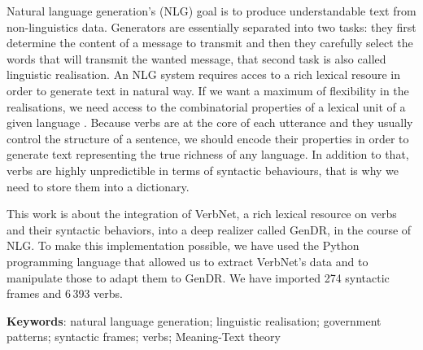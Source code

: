 Natural language generation's (NLG) goal is to produce understandable text from non-linguistics data. Generators are essentially separated into two tasks: they first determine the content of a message to transmit and then they carefully select the words that will transmit the wanted message, that second task is also called linguistic realisation. An NLG system requires acces to a rich lexical resoure in order to generate text in natural way. If we want a maximum of flexibility in the realisations, we need access to the combinatorial properties of a lexical unit of a given language . Because verbs are at the core of each utterance and they usually control the structure of a sentence, we should encode their properties in order to generate text representing the true richness of any language. In addition to that, verbs are highly unpredictible in terms of syntactic behaviours, that is why we need to store them into a dictionary.

This work is about the integration of VerbNet, a rich lexical resource on verbs and their syntactic behaviors, into a deep realizer called GenDR, in the course of NLG. To make this implementation possible, we have used the Python programming language that allowed us to extract VerbNet's data and to manipulate those to adapt them to GenDR. We have imported 274 syntactic frames and 6\,393 verbs.

\textbf{Keywords}: natural language generation; linguistic realisation; government patterns; syntactic frames; verbs; Meaning-Text theory
